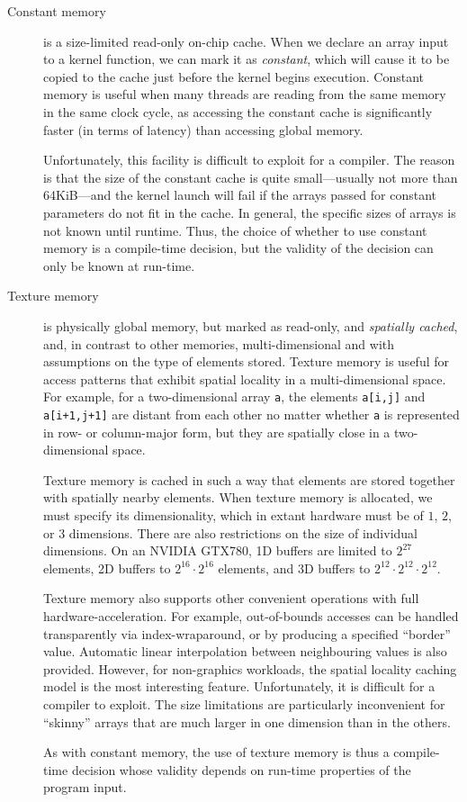 \begin{description}
\item[Constant memory] is a size-limited read-only on-chip cache.
  When we declare an array input to a kernel function, we can mark it
  as \textit{constant}, which will cause it to be copied to the cache
  just before the kernel begins execution.  Constant memory is useful
  when many threads are reading from the same memory in the same clock
  cycle, as accessing the constant cache is significantly faster (in
  terms of latency) than accessing global memory.

  Unfortunately, this facility is difficult to exploit for a compiler.
  The reason is that the size of the constant cache is quite
  small---usually not more than 64KiB---and the kernel launch will
  fail if the arrays passed for constant parameters do not fit in the
  cache.  In general, the specific sizes of arrays is not known until
  runtime.  Thus, the choice of whether to use constant memory is
  a compile-time decision, but the validity of the decision can only
  be known at run-time.

\item[Texture memory] is physically global memory, but marked as
  read-only, and \textit{spatially cached}, and, in contrast to other
  memories, multi-dimensional and with assumptions on the type of
  elements stored.  Texture memory is useful for access patterns that
  exhibit spatial locality in a multi-dimensional space.  For example,
  for a two-dimensional array \texttt{a}, the elements \texttt{a[i,j]}
  and \texttt{a[i+1,j+1]} are distant from each other no matter
  whether \texttt{a} is represented in row- or column-major form, but
  they are spatially close in a two-dimensional space.

  Texture memory is cached in such a way that elements are stored
  together with spatially nearby elements.  When texture memory is
  allocated, we must specify its dimensionality, which in extant
  hardware must be of $1$, $2$, or $3$ dimensions.  There are also
  restrictions on the size of individual dimensions.  On an NVIDIA
  GTX780, 1D buffers are limited to $2^{27}$ elements, 2D buffers
  to $2^{16}\cdot{}2^{16}$ elements, and 3D buffers to
  $2^{12}\cdot{}2^{12}\cdot{}2^{12}$.

  Texture memory also supports other convenient operations with full
  hardware-acceleration.  For example, out-of-bounds accesses can be
  handled transparently via index-wraparound, or by producing a
  specified ``border'' value.  Automatic linear interpolation between
  neighbouring values is also provided.  However, for non-graphics
  workloads, the spatial locality caching model is the most
  interesting feature.  Unfortunately, it is difficult for a compiler
  to exploit.  The size limitations are particularly inconvenient for
  ``skinny'' arrays that are much larger in one dimension than in the
  others.

  As with constant memory, the use of texture memory is thus a
  compile-time decision whose validity depends on run-time properties
  of the program input.
\end{description}


